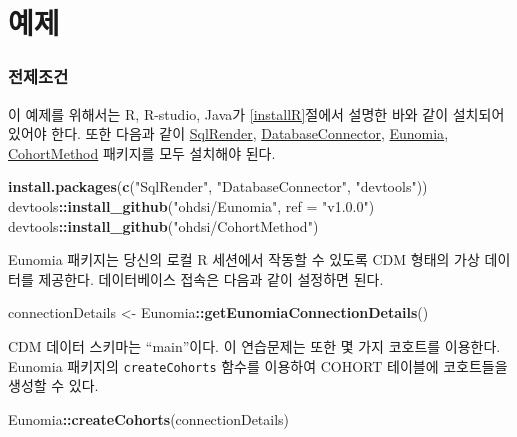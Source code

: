 \documentclass[11pt]{book}
\newenvironment{Shaded}{\begin{snugshade}}{\end{snugshade}}
\newcommand{\KeywordTok}[1]{\textcolor[rgb]{0.13,0.29,0.53}{\textbf{#1}}}
\newcommand{\DataTypeTok}[1]{\textcolor[rgb]{0.13,0.29,0.53}{#1}}
\newcommand{\StringTok}[1]{\textcolor[rgb]{0.31,0.60,0.02}{#1}}
\newcommand{\OperatorTok}[1]{\textcolor[rgb]{0.81,0.36,0.00}{\textbf{#1}}}
\newcommand{\NormalTok}[1]{#1}
\theoremstyle{definition}
\theoremstyle{definition}
\theoremstyle{definition}
\theoremstyle{remark}
\begin{document}
\section{예제}\label{-7}

\subsubsection*{전제조건}\label{-5}

이 예제를 위해서는 R, R-studio, Java가 \ref{installR}절에서 설명한 바와
같이 설치되어 있어야 한다. 또한 다음과 같이
\href{https://ohdsi.github.io/SqlRender/}{SqlRender},
\href{https://ohdsi.github.io/DatabaseConnector/}{DatabaseConnector},
\href{https://ohdsi.github.io/Eunomia/}{Eunomia},
\href{https://ohdsi.github.io/CohortMethod/}{CohortMethod} 패키지를 모두
설치해야 된다.

\begin{Shaded}
\begin{Highlighting}[]
\KeywordTok{install.packages}\NormalTok{(}\KeywordTok{c}\NormalTok{(}\StringTok{"SqlRender"}\NormalTok{, }\StringTok{"DatabaseConnector"}\NormalTok{, }\StringTok{"devtools"}\NormalTok{))}
\NormalTok{devtools}\OperatorTok{::}\KeywordTok{install_github}\NormalTok{(}\StringTok{"ohdsi/Eunomia"}\NormalTok{, }\DataTypeTok{ref =} \StringTok{"v1.0.0"}\NormalTok{)}
\NormalTok{devtools}\OperatorTok{::}\KeywordTok{install_github}\NormalTok{(}\StringTok{"ohdsi/CohortMethod"}\NormalTok{)}
\end{Highlighting}
\end{Shaded}

Eunomia 패키지는 당신의 로컬 R 세션에서 작동할 수 있도록 CDM 형태의 가상
데이터를 제공한다. 데이터베이스 접속은 다음과 같이 설정하면 된다.

\begin{Shaded}
\begin{Highlighting}[]
\NormalTok{connectionDetails <-}\StringTok{ }\NormalTok{Eunomia}\OperatorTok{::}\KeywordTok{getEunomiaConnectionDetails}\NormalTok{()}
\end{Highlighting}
\end{Shaded}

CDM 데이터 스키마는 ``main''이다. 이 연습문제는 또한 몇 가지 코호트를
이용한다. Eunomia 패키지의 \texttt{createCohorts} 함수를 이용하여 COHORT
테이블에 코호트들을 생성할 수 있다.

\begin{Shaded}
\begin{Highlighting}[]
\NormalTok{Eunomia}\OperatorTok{::}\KeywordTok{createCohorts}\NormalTok{(connectionDetails)}
\end{Highlighting}
\end{Shaded}
\end{document}
